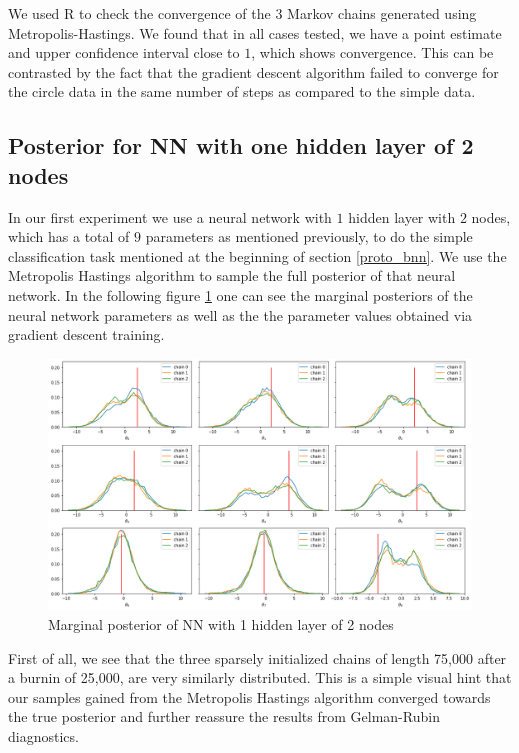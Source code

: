 \documentclass[review]{siamart190516}
\begin{document}
We used R to check the convergence of the $3$ Markov chains generated using Metropolis-Hastings. We found that in all cases tested, we have a point estimate and upper confidence interval close to $1$, which shows convergence. This can be contrasted by the fact that the gradient descent algorithm failed to converge for the circle data in the same number of steps as compared to the simple data. 

\subsection{Posterior for NN with one hidden layer of 2 nodes}

In our first experiment we use a neural network with $1$ hidden layer with $2$ nodes, which has a total of $9$ parameters as mentioned previously, to do the simple classification task mentioned at the beginning of section \ref{proto_bnn}. We use the Metropolis Hastings algorithm to sample the full posterior of that neural network. In the following figure \ref{fig:marg_post_nn2} one can see the marginal posteriors of the neural network parameters as well as the the parameter values obtained via gradient descent training.

\begin{figure}[h!]
    \centering
    \includegraphics[width = \textwidth]{Images/marginal_dists_normprior_sc3_100k_wide_withSGD.png}
    \caption{Marginal posterior of NN with 1 hidden layer of 2 nodes}
    \label{fig:marg_post_nn2}
\end{figure}

First of all, we see that the three sparsely initialized chains of length 75,000 after a burnin of 25,000, are very similarly distributed. This is a simple visual hint that our samples gained from the Metropolis Hastings algorithm converged towards the true posterior and further reassure the results from Gelman-Rubin diagnostics.
\end{document}
